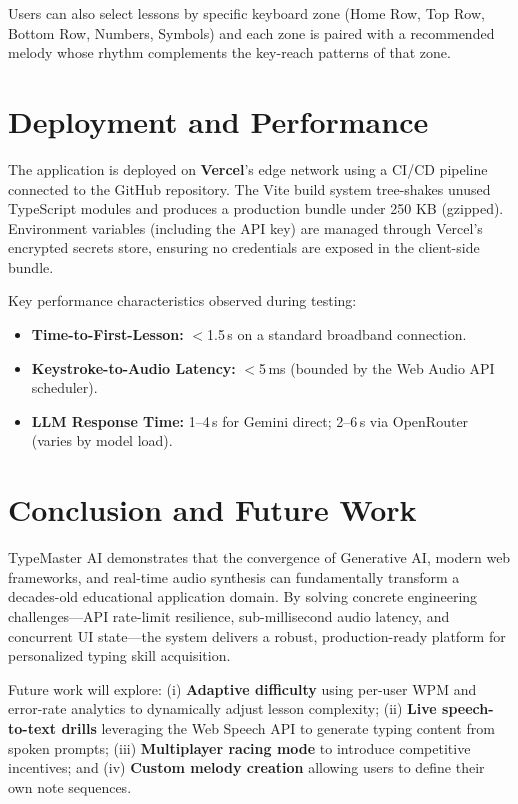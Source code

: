 \documentclass[conference]{IEEEtran}
\begin{document}
Users can also select lessons by specific keyboard zone (Home Row,
Top Row, Bottom Row, Numbers, Symbols) and each zone is paired with a
recommended melody whose rhythm complements the key-reach patterns of
that zone.

\section{Deployment and Performance}

The application is deployed on \textbf{Vercel}'s edge network using
a CI/CD pipeline connected to the GitHub repository. The Vite build
system tree-shakes unused TypeScript modules and produces a
production bundle under 250 KB (gzipped). Environment variables
(including the API key) are managed through Vercel's encrypted
secrets store, ensuring no credentials are exposed in the
client-side bundle.

Key performance characteristics observed during testing:
\begin{itemize}
  \item \textbf{Time-to-First-Lesson:} $<$1.5\,s on a standard
        broadband connection.
  \item \textbf{Keystroke-to-Audio Latency:} $<$5\,ms (bounded by
        the Web Audio API scheduler).
  \item \textbf{LLM Response Time:} 1--4\,s for Gemini direct;
        2--6\,s via OpenRouter (varies by model load).
\end{itemize}

\section{Conclusion and Future Work}

TypeMaster AI demonstrates that the convergence of Generative AI,
modern web frameworks, and real-time audio synthesis can
fundamentally transform a decades-old educational application domain.
By solving concrete engineering challenges---API rate-limit
resilience, sub-millisecond audio latency, and concurrent UI
state---the system delivers a robust, production-ready platform for
personalized typing skill acquisition.

Future work will explore: (i) \textbf{Adaptive difficulty} using
per-user WPM and error-rate analytics to dynamically adjust lesson
complexity; (ii) \textbf{Live speech-to-text drills} leveraging the
Web Speech API to generate typing content from spoken prompts;
(iii) \textbf{Multiplayer racing mode} to introduce competitive
incentives; and (iv) \textbf{Custom melody creation} allowing users
to define their own note sequences.
\end{document}
